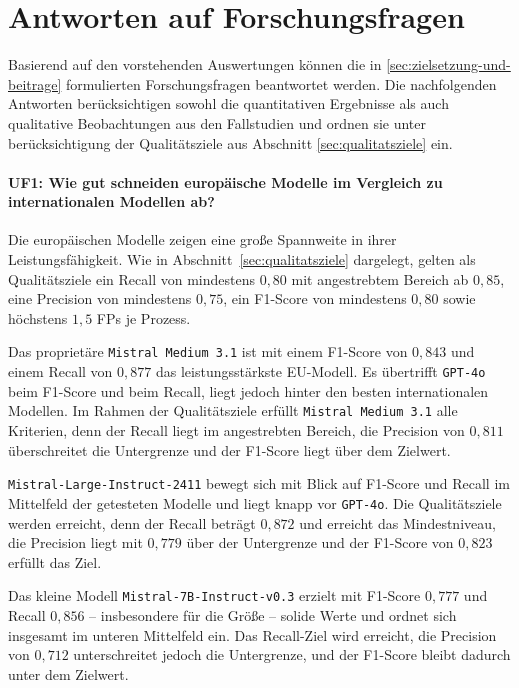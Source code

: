 \section{Antworten auf Forschungsfragen}\label{sec:antworten-auf-forschungsfragen}

Basierend auf den vorstehenden Auswertungen können die in \ref{sec:zielsetzung-und-beitrage} formulierten Forschungsfragen beantwortet werden. Die nachfolgenden Antworten berücksichtigen sowohl die quantitativen Ergebnisse als auch qualitative Beobachtungen aus den Fallstudien und ordnen sie unter berücksichtigung der Qualitätsziele aus Abschnitt \ref{sec:qualitatsziele} ein.

\paragraph{UF1: Wie gut schneiden europäische Modelle im Vergleich zu internationalen Modellen ab?}

Die europäischen Modelle zeigen eine große Spannweite in ihrer Leistungsfähigkeit. Wie in Abschnitt~\ref{sec:qualitatsziele} dargelegt, gelten als Qualitätsziele ein Recall von mindestens $0{,}80$ mit angestrebtem Bereich ab $0{,}85$, eine Precision von mindestens $0{,}75$, ein F1-Score von mindestens $0{,}80$ sowie höchstens $1{,}5$ \acp{FP} je Prozess.

Das proprietäre \texttt{Mistral Medium 3.1} ist mit einem F1-Score von $0{,}843$ und einem Recall von $0{,}877$ das leistungsstärkste \ac{EU}-Modell. Es übertrifft \texttt{GPT-4o} beim F1-Score und beim Recall, liegt jedoch hinter den besten internationalen Modellen. Im Rahmen der Qualitätsziele erfüllt \texttt{Mistral Medium 3.1} alle Kriterien, denn der Recall liegt im angestrebten Bereich, die Precision von $0{,}811$ überschreitet die Untergrenze und der F1-Score liegt über dem Zielwert.

\texttt{Mistral-Large-Instruct-2411} bewegt sich mit Blick auf F1-Score und Recall im Mittelfeld der getesteten Modelle und liegt knapp vor \texttt{GPT-4o}. Die Qualitätsziele werden erreicht, denn der Recall beträgt $0{,}872$ und erreicht das Mindestniveau, die Precision liegt mit $0{,}779$ über der Untergrenze und der F1-Score von $0{,}823$ erfüllt das Ziel.

Das kleine Modell \texttt{Mistral-7B-Instruct-v0.3} erzielt mit F1-Score $0{,}777$ und Recall $0{,}856$ – insbesondere für die Größe – solide Werte und ordnet sich insgesamt im unteren Mittelfeld ein. Das Recall-Ziel wird erreicht, die Precision von $0{,}712$ unterschreitet jedoch die Untergrenze, und der F1-Score bleibt dadurch unter dem Zielwert.

